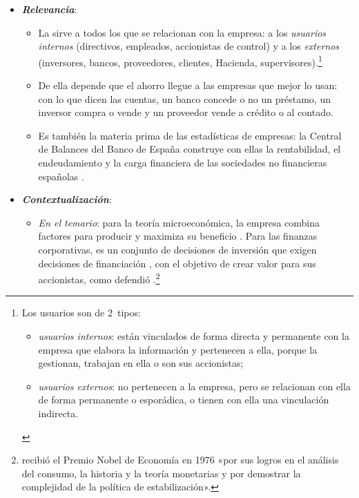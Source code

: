 \documentclass[11pt]{article}
\begin{document}
\begin{itemize}
\item \textbf{\emph{Relevancia}}:
  \begin{itemize}
  \item La  sirve a todos los que se relacionan con la empresa: a los \emph{usuarios internos} (directivos, empleados, accionistas de control) y a los \emph{externos} (inversores, bancos, proveedores, clientes, Hacienda, supervisores).\footnote{Los usuarios son de 2~tipos:
\begin{itemize}
\item \emph{usuarios internos}: están vinculados de forma directa y permanente con la empresa que elabora la información y pertenecen a ella, porque la gestionan, trabajan en ella o son sus accionistas;
\item \emph{usuarios externos}: no pertenecen a la empresa, pero se relacionan con ella de forma permanente o esporádica, o tienen con ella una vinculación indirecta.
\end{itemize}}
  \item De ella depende que el ahorro llegue a las empresas que mejor lo usan: con lo que dicen las cuentas, un banco concede o no un préstamo, un inversor compra o vende y un proveedor vende a crédito o al contado.
  \item Es también la materia prima de las estadísticas de empresas: la Central de Balances del Banco de España construye con ellas la rentabilidad, el endeudamiento y la carga financiera de las sociedades no financieras españolas .
  \end{itemize}

\item \textbf{\emph{Contextualización}}:
  \begin{itemize}
  \item \emph{En el temario}: para la teoría microeconómica, la empresa combina factores para producir y maximiza su beneficio . Para las finanzas corporativas, es un conjunto de decisiones de inversión  que exigen decisiones de financiación , con el objetivo de crear valor para sus accionistas, como defendió \textcite{Friedman1970Social}.\footnote{ recibió el Premio Nobel de Economía en 1976 «por sus logros en el análisis del consumo, la historia y la teoría monetarias y por demostrar la complejidad de la política de estabilización»\nocite{Nobel1976Friedman}. 

}
\end{itemize}
\end{itemize}
\end{document}
